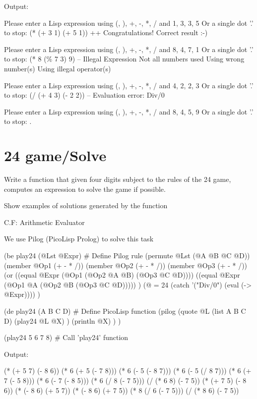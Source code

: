 \begin{wideverbatim}

Output:

Please enter a Lisp expression using (, ), +, -, *, / and 1, 3, 3, 5
Or a single dot '.' to stop: (* (+ 3 1) (+ 5 1))
++ Congratulations! Correct result :-)

Please enter a Lisp expression using (, ), +, -, *, / and 8, 4, 7, 1
Or a single dot '.' to stop: (* 8 (\% 7 3) 9)
-- Illegal Expression
   Not all numbers used
   Using wrong number(s)
   Using illegal operator(s)

Please enter a Lisp expression using (, ), +, -, *, / and 4, 2, 2, 3
Or a single dot '.' to stop: (/ (+ 4 3) (- 2 2))
-- Evaluation error: Div/0

Please enter a Lisp expression using (, ), +, -, *, / and 8, 4, 5, 9
Or a single dot '.' to stop: .

\end{wideverbatim}

\pagebreak{}
\section*{24 game/Solve}


Write a function that given four digits subject to the rules of the
24 game, computes an expression to solve the game
if possible.

Show examples of solutions generated by the function

C.F: Arithmetic Evaluator


\begin{wideverbatim}

We use Pilog (PicoLisp Prolog) to solve this task

(be play24 (@Lst @Expr)                # Define Pilog rule
   (permute @Lst (@A @B @C @D))
   (member @Op1 (+ - * /))
   (member @Op2 (+ - * /))
   (member @Op3 (+ - * /))
   (or
      ((equal @Expr (@Op1 (@Op2 @A @B) (@Op3 @C @D))))
      ((equal @Expr (@Op1 @A (@Op2 @B (@Op3 @C @D))))) )
   (@ = 24 (catch '("Div/0") (eval (-> @Expr)))) )

(de play24 (A B C D)                   # Define PicoLisp function
   (pilog
      (quote
         @L (list A B C D)
         (play24 @L @X) )
      (println @X) ) )

(play24 5 6 7 8)                       # Call 'play24' function

Output:

(* (+ 5 7) (- 8 6))
(* 6 (+ 5 (- 7 8)))
(* 6 (- 5 (- 8 7)))
(* 6 (- 5 (/ 8 7)))
(* 6 (+ 7 (- 5 8)))
(* 6 (- 7 (- 8 5)))
(* 6 (/ 8 (- 7 5)))
(/ (* 6 8) (- 7 5))
(* (+ 7 5) (- 8 6))
(* (- 8 6) (+ 5 7))
(* (- 8 6) (+ 7 5))
(* 8 (/ 6 (- 7 5)))
(/ (* 8 6) (- 7 5))

\end{wideverbatim}

